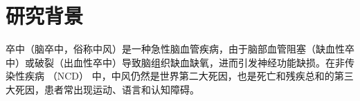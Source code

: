 
\section{研究背景}

卒中（脑卒中，俗称中风）是一种急性脑血管疾病，由于脑部血管阻塞（缺血性卒中）或破裂（出血性卒中）导致脑组织缺血缺氧，进而引发神经功能缺损。在非传染性疾病 （NCD） 中，中风仍然是世界第二大死因，也是死亡和残疾总和的第三大死因\cite{valery2025}，患者常出现运动、语言和认知障碍。